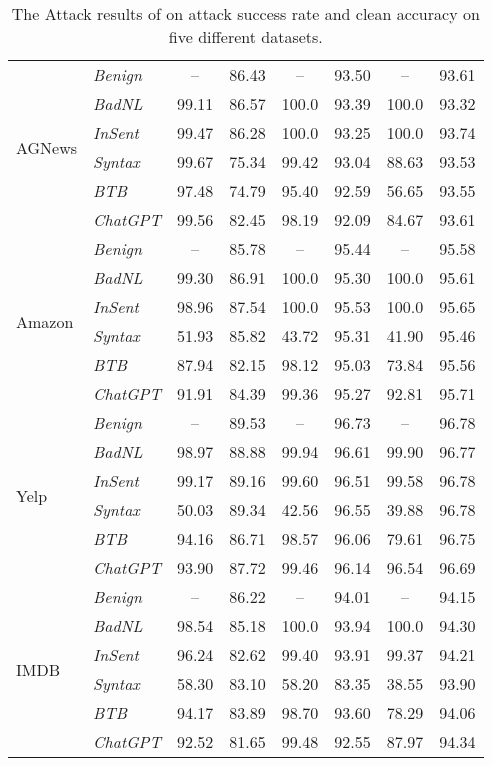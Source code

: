 \begin{table*}[!t]
\begin{tabular}{l|l|cccccc}
\multirow{6}{3em}{AGNews} 
    & \emph{Benign}  & -- & 86.43   & --     &  93.50 & -- & 93.61 \\ 
    & \emph{BadNL}  & 99.11 & 86.57    &  100.0    &   93.39 &  100.0  &  93.32   \\ 
    & \emph{InSent} & 99.47 & 86.28    &   100.0   &  93.25   & 100.0   &  93.74     \\
    & \emph{Syntax} & 99.67 & 75.34    & 99.42     & 93.04 & 88.63 &   93.53   \\
    & \emph{BTB}  & 97.48 & 74.79      & 95.40    & 92.59 & 56.65 &  93.55  \\
    & \emph{ChatGPT} & 99.56 & 82.45   & 98.19    & 92.09 & 84.67 & 93.61 \\
\hline
\multirow{6}{3em}{Amazon}  
    & \emph{Benign}  & -- & 85.78  &  --    &  95.44 & -- & 95.58\\ 
    & \emph{BadNL}   & 99.30 & 86.91  & 100.0     &  95.30    & 100.0     &   95.61 \\
    & \emph{InSent}  & 98.96 & 87.54  & 100.0    &  95.53   &  100.0   &   95.65   \\
    & \emph{Syntax} & 51.93 & 85.82& 43.72  &  95.31   & 41.90 &  95.46    \\ 
    & \emph{BTB}  & 87.94 & 82.15& 98.12 & 95.03  & 73.84 & 95.56  \\
    & \emph{ChatGPT} & 91.91 & 84.39 & 99.36 & 95.27 & 92.81 & 95.71 \\
\hline
\multirow{6}{3em}{Yelp}
    & \emph{Benign}   & -- & 89.53 & --     & 96.73  & --    & 96.78\\ 
    & \emph{BadNL}   & 98.97 & 88.88 & 99.94  & 96.61  & 99.90 & 96.77   \\
    & \emph{InSent}  & 99.17 &  89.16 & 99.60  & 96.51  & 99.58 & 96.78  \\
    & \emph{Syntax} & 50.03 & 89.34& 42.56  & 96.55  & 39.88 & 96.78  \\ 
    & \emph{BTB} & 94.16 & 86.71& 98.57  & 96.06  & 79.61 & 96.75 \\
    & \emph{ChatGPT} & 93.90 & 87.72 & 99.46  & 96.14  & 96.54 & 96.69  \\

\hline
\multirow{6}{3em}{IMDB}  
    & \emph{Benign}    & -- & 86.22 & -- &  94.01  & -- & 94.15 \\ 
    & \emph{BadNL}    & 98.54 & 85.18 &  100.0  & 93.94  &  100.0 &  94.30 \\
    & \emph{InSent}   & 96.24 & 82.62  &  99.40 & 93.91  & 99.37 & 94.21 \\
    & \emph{Syntax}   & 58.30 &	83.10&  58.20 & 83.35  & 38.55 & 93.90 \\
    & \emph{BTB}   & 94.17 & 83.89  &  98.70 &  93.60 & 78.29 &  94.06\\
    & \emph{ChatGPT}  & 92.52 & 81.65 & 99.48 & 92.55   & 87.97 & 94.34  \\
\hline
\end{tabular}
\caption{The Attack results of \method on attack success rate and clean accuracy on five different datasets.}
\label{tab:result_Attack_BERT} 
\end{table*}

